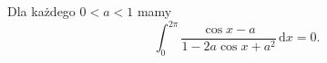%

\begin{problem}[pytanie 3088503]
    \label{stack_3088503}%
    Dla każdego $0 < a < 1$ mamy
    \begin{equation}
        \int_0^{2\pi} \frac{\cos x - a}{1 - 2 a \cos x + a^2} \,\mathrm{d} x = 0.
    \end{equation}
\end{problem}


%